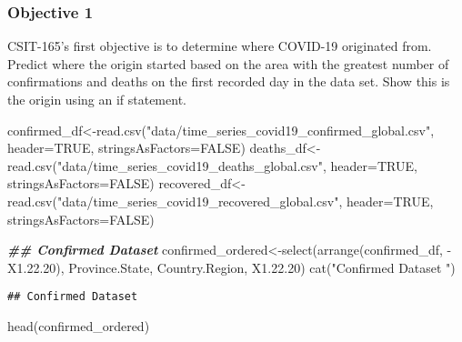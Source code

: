 \documentclass[
]{article}
\newenvironment{Shaded}{\begin{snugshade}}{\end{snugshade}}
\newcommand{\AttributeTok}[1]{\textcolor[rgb]{0.77,0.63,0.00}{#1}}
\newcommand{\ConstantTok}[1]{\textcolor[rgb]{0.00,0.00,0.00}{#1}}
\newcommand{\DocumentationTok}[1]{\textcolor[rgb]{0.56,0.35,0.01}{\textbf{\textit{#1}}}}
\newcommand{\FloatTok}[1]{\textcolor[rgb]{0.00,0.00,0.81}{#1}}
\newcommand{\FunctionTok}[1]{\textcolor[rgb]{0.00,0.00,0.00}{#1}}
\newcommand{\NormalTok}[1]{#1}
\newcommand{\OtherTok}[1]{\textcolor[rgb]{0.56,0.35,0.01}{#1}}
\newcommand{\SpecialCharTok}[1]{\textcolor[rgb]{0.00,0.00,0.00}{#1}}
\newcommand{\StringTok}[1]{\textcolor[rgb]{0.31,0.60,0.02}{#1}}
\begin{document}
\hypertarget{objective-1}{%
\subsubsection{Objective 1}\label{objective-1}}

CSIT-165's first objective is to determine where COVID-19 originated
from. Predict where the origin started based on the area with the
greatest number of confirmations and deaths on the first recorded day in
the data set. Show this is the origin using an if statement.

\begin{Shaded}
\begin{Highlighting}[]
\NormalTok{confirmed\_df}\OtherTok{\textless{}{-}}\FunctionTok{read.csv}\NormalTok{(}\StringTok{"data/time\_series\_covid19\_confirmed\_global.csv"}\NormalTok{, }
                       \AttributeTok{header=}\ConstantTok{TRUE}\NormalTok{, }\AttributeTok{stringsAsFactors=}\ConstantTok{FALSE}\NormalTok{)}
\NormalTok{deaths\_df}\OtherTok{\textless{}{-}}\FunctionTok{read.csv}\NormalTok{(}\StringTok{"data/time\_series\_covid19\_deaths\_global.csv"}\NormalTok{, }
                    \AttributeTok{header=}\ConstantTok{TRUE}\NormalTok{, }\AttributeTok{stringsAsFactors=}\ConstantTok{FALSE}\NormalTok{)}
\NormalTok{recovered\_df}\OtherTok{\textless{}{-}}\FunctionTok{read.csv}\NormalTok{(}\StringTok{"data/time\_series\_covid19\_recovered\_global.csv"}\NormalTok{, }
                       \AttributeTok{header=}\ConstantTok{TRUE}\NormalTok{, }\AttributeTok{stringsAsFactors=}\ConstantTok{FALSE}\NormalTok{)}

\DocumentationTok{\#\# Confirmed Dataset}
\NormalTok{confirmed\_ordered}\OtherTok{\textless{}{-}}\FunctionTok{select}\NormalTok{(}\FunctionTok{arrange}\NormalTok{(confirmed\_df, }\SpecialCharTok{{-}}\NormalTok{X1.}\FloatTok{22.20}\NormalTok{), }
\NormalTok{                          Province.State, Country.Region, X1.}\FloatTok{22.20}\NormalTok{)}
\FunctionTok{cat}\NormalTok{(}\StringTok{"Confirmed Dataset "}\NormalTok{)}
\end{Highlighting}
\end{Shaded}

\begin{verbatim}
## Confirmed Dataset
\end{verbatim}

\begin{Shaded}
\begin{Highlighting}[]
\FunctionTok{head}\NormalTok{(confirmed\_ordered)}
\end{Highlighting}
\end{Shaded}
\end{document}
